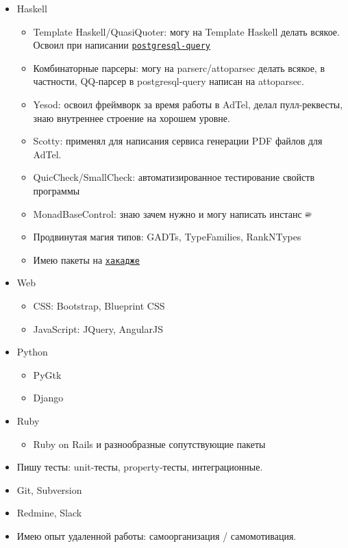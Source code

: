 \documentclass[10pt,a4paper,sans]{moderncv}        %
\newcommand*{\nlink}[2]{\textcolor{blue}{\texttt{\underline{\href{#1}{#2}}}}}
\begin{document}
\begin{itemize}
\item Haskell
  \begin{itemize}
  \item Template Haskell/QuasiQuoter: могу на Template Haskell
    делать всякое. Освоил при написании
    \nlink{http://hackage.haskell.org/package/postgresql-query}{postgresql-query}
  \item Комбинаторные парсеры: могу на parserc/attoparsec делать
    всякое, в частности, QQ-парсер в \hbox{postgresql-query} написан на
    \hbox{attoparsec}.
  \item Yesod: освоил фреймворк за время работы в AdTel, делал
    пулл-реквесты, знаю внутреннее строение на хорошем уровне.
  \item Scotty: применял для написания сервиса генерации PDF файлов для AdTel.
  \item QuicCheck/SmallCheck: автоматизированное тестирование свойств
    программы
  \item MonadBaseControl: знаю зачем нужно и могу написать инстанс \includegraphics[height=0.6em]{Trollface_HD}
  \item Продвинутая магия типов: GADTs, TypeFamilies, RankNTypes
  \item Имею пакеты на \nlink{http://hackage.haskell.org/user/AlekseyUymanov}{хакадже}
  \end{itemize}
\item Web
  \begin{itemize}
  \item CSS: Bootstrap, Blueprint CSS
  \item JavaScript: JQuery, AngularJS
  \end{itemize}
\item Python
  \begin{itemize}
  \item PyGtk
  \item Django
  \end{itemize}
\item Ruby
  \begin{itemize}
  \item Ruby on Rails и разнообразные сопутствующие пакеты
  \end{itemize}
\item Пишу тесты: unit-тесты, property-тесты, интеграционные.
\item Git, Subversion
\item Redmine, Slack
\item Имею опыт удаленной работы: самоорганизация / самомотивация.


\end{itemize}
\end{document}
